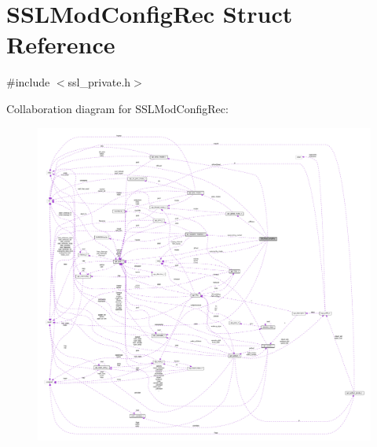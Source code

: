 \hypertarget{structSSLModConfigRec}{}\section{S\+S\+L\+Mod\+Config\+Rec Struct Reference}
\label{structSSLModConfigRec}


{\ttfamily \#include $<$ssl\+\_\+private.\+h$>$}



Collaboration diagram for S\+S\+L\+Mod\+Config\+Rec\+:
\nopagebreak
\begin{figure}[H]
\begin{center}
\leavevmode
\includegraphics[width=350pt]{structSSLModConfigRec__coll__graph}
\end{center}
\end{figure}
